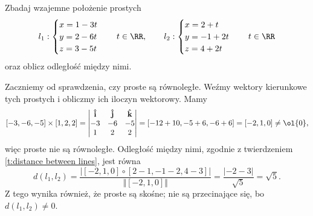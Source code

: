 \begin{example}
    Zbadaj wzajemne położenie prostych
    \[ l_1 : \begin{cases}
        x = 1 - 3t \\
        y = 2 - 6t \\
        z = 3 - 5t
    \end{cases} \quad t \in \RR, \qquad
    l_2 : \begin{cases}
        x = 2 + t \\
        y = -1 + 2t \\
        z = 4 + 2t
    \end{cases} \quad t \in \RR \]
    oraz oblicz odległość między nimi.
\end{example}
\begin{solution}
    Zaczniemy od sprawdzenia, czy proste są równoległe. Weźmy wektory kierunkowe tych prostych i obliczmy ich iloczyn wektorowy. Mamy
    \[ [-3, -6, -5] \times [1, 2, 2] = \begin{vmatrix}
        \mathbf{\hat{i}} & \mathbf{\hat{j}} & \mathbf{\hat{k}} \\
        -3 & -6 & -5 \\
        1 & 2 & 2
    \end{vmatrix} = [-12 + 10, -5 + 6, -6 + 6] = [-2, 1, 0] \neq \ol{0}, \]
    więc proste nie są równoległe. Odległość między nimi, zgodnie z twierdzeniem \ref{t:distance between lines}, jest równa
    \[ d(l_1, l_2) = \frac{|[-2, 1, 0] \circ [2-1, -1-2, 4-3]|}{\Vert[-2, 1, 0]\Vert} = \frac{|-2 - 3|}{\sqrt{5}} = \sqrt{5}. \]
    Z tego wynika również, że proste są skośne; nie są przecinające się, bo $d(l_1, l_2) \neq 0$.
\end{solution}

